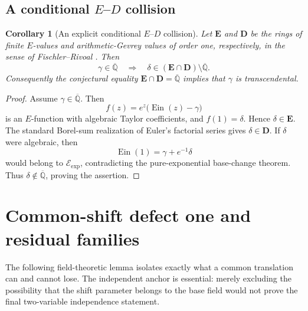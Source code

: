 \documentclass[11pt]{article}
\newtheorem{corollary}[theorem]{Corollary}
\theoremstyle{definition}
\theoremstyle{remark}
\newcommand{\Qbar}{\overline{\mathbb Q}}
\newcommand{\Ein}{\operatorname{Ein}}
\newcommand{\Eexp}{\mathcal E_{\mathrm{exp}}}
\begin{document}
\subsection{A conditional \texorpdfstring{\(E\)--\(D\)}{E--D} collision}

\begin{corollary}[An explicit conditional \(E\)--\(D\) collision]
\label{cor:gamma-algebraic-ED-collision}
Let \(\mathbf E\) and \(\mathbf D\) be the rings of finite \(E\)-values
and arithmetic-Gevrey values of order one, respectively, in the sense of
Fischler--Rivoal \cite{FR2024ED}.  Then
\begin{equation}\label{eq:gamma-algebraic-ED-collision}
 \boxed{
 \gamma\in\Qbar
 \quad\Longrightarrow\quad
 \delta\in(\mathbf E\cap\mathbf D)\setminus\Qbar.}
\end{equation}
Consequently the conjectural equality
\(\mathbf E\cap\mathbf D=\Qbar\) implies that \(\gamma\) is
transcendental.
\end{corollary}

\begin{proof}
Assume \(\gamma\in\Qbar\).  Then
\[
 f(z)=e^z\bigl(\Ein(z)-\gamma\bigr)
\]
is an \(E\)-function with algebraic Taylor coefficients, and
\(f(1)=\delta\).  Hence \(\delta\in\mathbf E\).  The standard Borel-sum
realization of Euler's factorial series gives \(\delta\in\mathbf D\).
If \(\delta\) were algebraic, then
\[
 \Ein(1)=\gamma+e^{-1}\delta
\]
would belong to \(\Eexp\), contradicting the pure-exponential base-change
theorem.  Thus \(\delta\notin\Qbar\), proving the assertion.
\end{proof}

\section{Common-shift defect one and residual families}
\label{sec:common-shift-residuals}

The following field-theoretic lemma isolates exactly what a common
translation can and cannot lose.  The independent anchor is essential: merely
excluding the possibility that the shift parameter belongs to the base field
would not prove the final two-variable independence statement.
\end{document}
